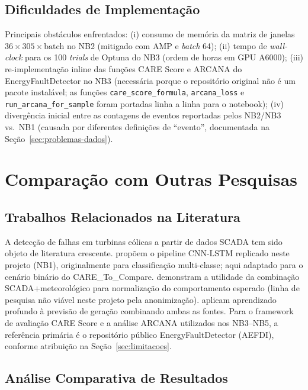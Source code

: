 \documentclass[12pt]{article}
\begin{document}
\subsection{Dificuldades de Implementação}

Principais obstáculos enfrentados: (i) consumo de memória da matriz de janelas $36 \times 305 \times \mathrm{batch}$ no NB2 (mitigado com AMP e \textit{batch} 64); (ii) tempo de \textit{wall-clock} para os 100 \textit{trials} de Optuna do NB3 (ordem de horas em GPU A6000); (iii) re-implementação inline das funções CARE Score e ARCANA do EnergyFaultDetector no NB3 (necessária porque o repositório original não é um pacote instalável; as funções \texttt{care\_score\_formula}, \texttt{arcana\_loss} e \texttt{run\_arcana\_for\_sample} foram portadas linha a linha para o notebook); (iv) divergência inicial entre as contagens de eventos reportadas pelos NB2/NB3 vs.\ NB1 (causada por diferentes definições de ``evento'', documentada na Seção~\ref{sec:problemas-dados}).

\section{Comparação com Outras Pesquisas}

\subsection{Trabalhos Relacionados na Literatura}

A detecção de falhas em turbinas eólicas a partir de dados SCADA tem sido objeto de literatura crescente. \citet{Qi2024_CNN_LSTM_Energies} propõem o pipeline CNN-LSTM replicado neste projeto (NB1), originalmente para classificação multi-classe; aqui adaptado para o cenário binário do CARE\_To\_Compare. \citet{Schlechtingen_2013} demonstram a utilidade da combinação SCADA+meteorológico para normalização do comportamento esperado (linha de pesquisa não viável neste projeto pela anonimização). \citet{Lin2021_PowerForecast} aplicam aprendizado profundo à previsão de geração combinando ambas as fontes. Para o framework de avaliação CARE Score e a análise ARCANA utilizados nos NB3--NB5, a referência primária é o repositório público EnergyFaultDetector (AEFDI), conforme atribuição na Seção~\ref{sec:limitacoes}.

\subsection{Análise Comparativa de Resultados}
\end{document}
